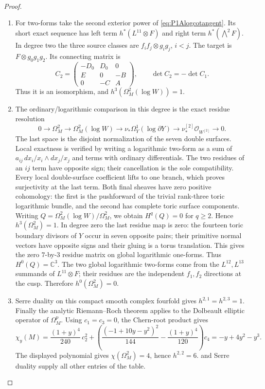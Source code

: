 \begin{proof}
\begin{enumerate}[label={$\langle1\rangle$\arabic*.}]
\item For two-forms take the second exterior power of
\eqref{eq:P1Alogcotangent}. Its short exact sequence has left
term $h^*(L^{11}\otimes F)$ and right term
$h^*(\bigwedge^2F)$. In degree two the three source classes
are $f_if_j\otimes g_ig_j$, $i<j$. The target is
$F\otimes g_0g_1g_2$. Its connecting matrix is
\[
C_2=\begin{pmatrix}-D_0&D_0&0\\E&0&-B\\0&-C&A\end{pmatrix},
\qquad \det C_2=-\det C_1.
\]
Thus it is an isomorphism, and
$h^3(\Omega_M^2(\log W))=1$.

\item The ordinary/logarithmic comparison in this degree is the
exact residue resolution
\[
0\to\Omega_M^2\to\Omega_M^2(\log W)
 \to\nu_*\Omega_Y^1(\log\partial Y)
 \to\nu^{[2]}_*\mathcal O_{W^{[2]}}\to0.
\]
The last space is the disjoint normalization of the seven
double surfaces. Local exactness is verified by writing a
logarithmic two-form as a sum of
$a_{ij}\,dx_i/x_i\wedge dx_j/x_j$ and terms with ordinary
differentials. The two residues of an $ij$ term have opposite
sign; their cancellation is the sole compatibility. Every local
double-surface coefficient lifts to one branch, which proves
surjectivity at the last term.
Both final sheaves have zero positive cohomology: the first
is the pushforward of the trivial rank-three toric logarithmic
bundle, and the second has complete toric surface components.
Writing $Q=\Omega_M^2(\log W)/\Omega_M^2$, we obtain
$H^q(Q)=0$ for $q\ge2$. Hence
$h^3(\Omega_M^2)=1$.
In degree zero the last residue map is zero: the fourteen toric
boundary divisors of $Y$ occur in seven opposite pairs; their
primitive normal vectors have opposite signs and their gluing
is a torus translation. This gives the zero $7$-by-$3$ residue
matrix on global logarithmic one-forms. Thus $H^0(Q)=\mathbb C^3$.
The two global logarithmic two-forms come from the
$L^{12},L^{13}$ summands of $L^{11}\otimes F$; their residues
are the independent $f_1,f_2$ directions at the cusp.
Therefore $h^0(\Omega_M^2)=0$.

\item Serre duality \cite[Theorem 4, p.~22]{Serre1955Duality} on this compact smooth complex fourfold gives
$h^{2,1}=h^{2,3}=1$. Finally the analytic Riemann--Roch theorem
\cite[Theorem 25.3.1, p.~187; \S25.4(a), pp.~188--190]{HirzebruchTopologicalMethods} applies to the Dolbeault elliptic
operator of $\Omega_M^p$.
Using $c_1=c_3=0$, the Chern-root product gives
\[
\chi_y(M)=
\frac{(1+y)^4}{240}\,c_2^2+
\left(\frac{(-1+10y-y^2)^2}{144}
       -\frac{(1+y)^4}{120}\right)c_4
=-y+4y^2-y^3.
\]
The displayed polynomial gives
$\chi(\Omega_M^2)=4$, hence $h^{2,2}=6$.
 and Serre duality supply all other entries of the table.

\end{enumerate}
\end{proof}




